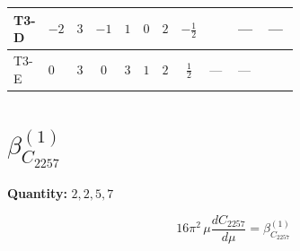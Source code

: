 \documentclass[8pt]{article}
\begin{document}
\begin{landscape}
\begin{longtable}{@{}llcccccc >{\raggedright\arraybackslash}p{0.21\linewidth} >{\raggedright\arraybackslash}p{0.21\linewidth} >{\raggedright\arraybackslash}p{0.21\linewidth}@{}}
\midrule
T3-D & $-2$ & $3$ & $-1$ & $1$ & $0$ & $2$ & $-\frac{1}{2}$ & \scriptsize\adjustbox{max width=\linewidth}{$\begin{gathered} - \frac{2 \sqrt{3} lambdaT_{3} \overline{y_{1}} \overline{y_{2}}}{3 MF}\end{gathered}$} & --- & --- \\
\midrule
T3-E & $0$ & $3$ & $0$ & $3$ & $1$ & $2$ & $\frac{1}{2}$ & --- & --- & \scriptsize\adjustbox{max width=\linewidth}{$\begin{gathered} \frac{2 \sqrt{6} lambdaT_{3} \overline{y_{1}} \overline{y_{2}}}{3 MF}\end{gathered}$} \\
\midrule
\bottomrule
\end{longtable}
\clearpage
\section*{$\beta_{C_{2257}}^{(1)}$}
\noindent\textbf{Quantity: }$\mathrm{2,2,5,7}$\par\smallskip
\[16\pi^2\,\mu\frac{d C_{2257}}{d\mu}=\beta_{C_{2257}}^{(1)}\]

\end{landscape}
\end{document}

